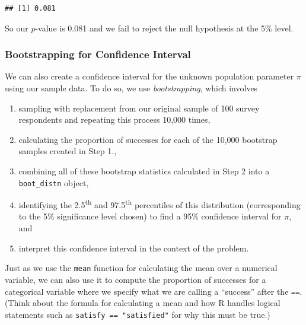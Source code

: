 \documentclass[]{tufte-book}
\newenvironment{Shaded}{\begin{snugshade}}{\end{snugshade}}
\newcommand{\KeywordTok}[1]{\textcolor[rgb]{0.13,0.29,0.53}{\textbf{{#1}}}}
\newcommand{\DataTypeTok}[1]{\textcolor[rgb]{0.13,0.29,0.53}{{#1}}}
\newcommand{\DecValTok}[1]{\textcolor[rgb]{0.00,0.00,0.81}{{#1}}}
\newcommand{\StringTok}[1]{\textcolor[rgb]{0.31,0.60,0.02}{{#1}}}
\newcommand{\OtherTok}[1]{\textcolor[rgb]{0.56,0.35,0.01}{{#1}}}
\newcommand{\NormalTok}[1]{{#1}}
\providecommand{\tightlist}{%
  \setlength{\itemsep}{0pt}\setlength{\parskip}{0pt}}
\begin{document}
\begin{verbatim}
## [1] 0.081
\end{verbatim}

So our \(p\)-value is 0.081 and we fail to reject the null hypothesis at
the 5\% level.

\subsubsection{Bootstrapping for Confidence
Interval}\label{bootstrapping-for-confidence-interval-1}

We can also create a confidence interval for the unknown population
parameter \(\pi\) using our sample data. To do so, we use
\emph{bootstrapping}, which involves

\begin{enumerate}
\def\labelenumi{\arabic{enumi}.}
\tightlist
\item
  sampling with replacement from our original sample of 100 survey
  respondents and repeating this process 10,000 times,
\item
  calculating the proportion of successes for each of the 10,000
  bootstrap samples created in Step 1.,
\item
  combining all of these bootstrap statistics calculated in Step 2 into
  a \texttt{boot\_distn} object,
\item
  identifying the 2.5\textsuperscript{th} and 97.5\textsuperscript{th}
  percentiles of this distribution (corresponding to the 5\%
  significance level chosen) to find a 95\% confidence interval for
  \(\pi\), and
\item
  interpret this confidence interval in the context of the problem.
\end{enumerate}

\begin{Shaded}
\end{Shaded}

Just as we use the \texttt{mean} function for calculating the mean over
a numerical variable, we can also use it to compute the proportion of
successes for a categorical variable where we specify what we are
calling a ``success'' after the \texttt{==}. (Think about the formula
for calculating a mean and how R handles logical statements such as
\texttt{satisfy\ ==\ "satisfied"} for why this must be true.)
\end{document}

